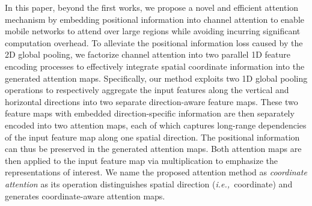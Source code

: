 \documentclass[final]{cvpr}
\def\ie{\emph{i.e.,~}}
\begin{document}
In this paper, beyond the first works, 
we propose a novel and efficient attention mechanism by embedding positional information into channel attention to enable mobile networks to attend over large regions while avoiding incurring significant computation overhead.
%
To alleviate the positional information loss caused by the 2D global pooling, we factorize channel attention into two parallel 1D feature encoding processes to effectively integrate spatial coordinate information into the generated attention maps. 
%
Specifically, our method exploits two 1D global pooling operations to respectively aggregate the input features along the vertical and horizontal directions into two separate direction-aware feature maps.
%
These two feature maps with embedded direction-specific information are then separately encoded into two attention maps, each of which captures long-range dependencies of the input feature map along one spatial direction.
%
The positional information can thus be preserved in the generated attention maps.
%
%
Both attention maps are then applied to the input feature map via multiplication to emphasize the representations of interest.
%
We name the proposed attention method as \emph{coordinate attention} as its operation distinguishes spatial direction (\ie coordinate) and generates coordinate-aware attention maps.
%
%
%
\end{document}
